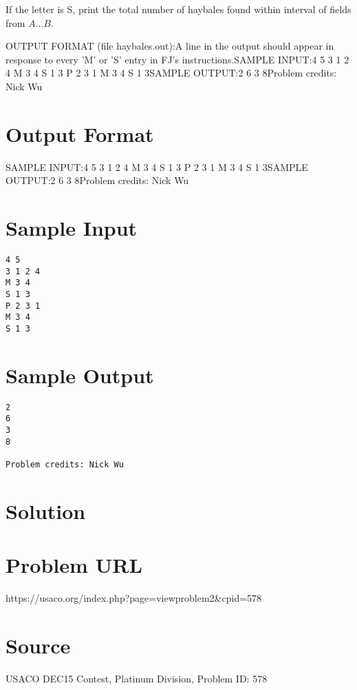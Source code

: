 \documentclass[12pt]{article}
\begin{document}
If the letter is S, print the total number of haybales found within interval of
fields from $A \ldots B$.

OUTPUT FORMAT (file haybales.out):A line in the output should appear in response to every 'M' or 'S' entry in FJ's
instructions.SAMPLE INPUT:4 5
3 1 2 4
M 3 4
S 1 3
P 2 3 1
M 3 4
S 1 3SAMPLE OUTPUT:2
6
3
8Problem credits: Nick Wu

\section*{Output Format}
SAMPLE INPUT:4 5
3 1 2 4
M 3 4
S 1 3
P 2 3 1
M 3 4
S 1 3SAMPLE OUTPUT:2
6
3
8Problem credits: Nick Wu

\section*{Sample Input}
\begin{verbatim}
4 5
3 1 2 4
M 3 4
S 1 3
P 2 3 1
M 3 4
S 1 3
\end{verbatim}

\section*{Sample Output}
\begin{verbatim}
2
6
3
8

Problem credits: Nick Wu
\end{verbatim}

\section*{Solution}


\section*{Problem URL}
https://usaco.org/index.php?page=viewproblem2&cpid=578

\section*{Source}
USACO DEC15 Contest, Platinum Division, Problem ID: 578
\end{document}
